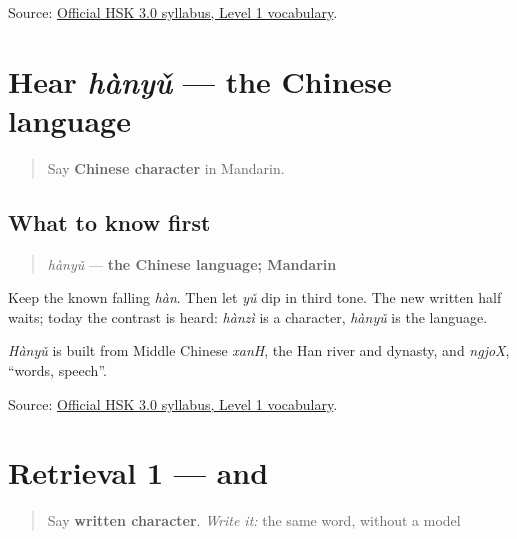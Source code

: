 \begin{tcolorbox}[breakable,colback=teal!4,colframe=teal!35!black,title={Before you move on}]
Source: \href{https://hsk.cn-bj.ufileos.com/3.0/\%E6\%96\%B0\%E7\%89\%88HSK\%E8\%80\%83\%E8\%AF\%95\%E5\%A4\%A7\%E7\%BA\%B21219.pdf}{Official HSK 3.0 syllabus, Level 1 vocabulary}.
\end{tcolorbox}
\section[hànyǔ]{Hear \emph{hànyǔ} — the Chinese language}

\label{lesson:ZH-C16-hear-hanyu}



\begin{quote}
Say \textbf{Chinese character} in Mandarin.
\end{quote}

\subsection*{What to know first}
\begin{quote}
\emph{hànyǔ} — \textbf{the Chinese language; Mandarin}
\end{quote}

Keep the known falling \emph{hàn}. Then let \emph{yǔ} dip in third tone. The new written half waits; today the contrast is heard: \emph{hànzì} is a character, \emph{hànyǔ} is the language.

\emph{Hànyǔ} is built from Middle Chinese \emph{xanH}, the Han river and dynasty, and \emph{ngjoX}, \textquotedblleft{}words, speech\textquotedblright{}.

\begin{tcolorbox}[breakable,colback=teal!4,colframe=teal!35!black,title={Before you move on}]
Source: \href{https://hsk.cn-bj.ufileos.com/3.0/\%E6\%96\%B0\%E7\%89\%88HSK\%E8\%80\%83\%E8\%AF\%95\%E5\%A4\%A7\%E7\%BA\%B21219.pdf}{Official HSK 3.0 syllabus, Level 1 vocabulary}.
\end{tcolorbox}
\section[Practice]{Retrieval 1 —  and }

\label{lesson:ZH-R16-identity-1}



\begin{quote}
Say \textbf{written character}. \emph{Write it:} the same word, without a model
\end{quote}

